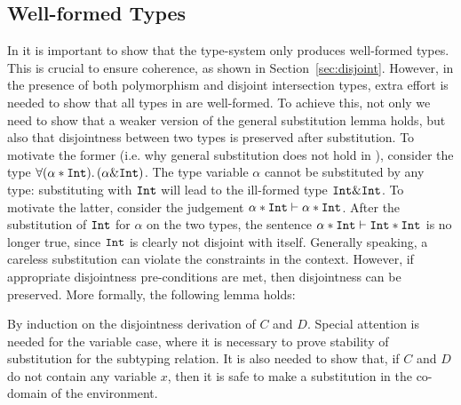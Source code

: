 \subsection{Well-formed Types}
In \name it is important to show that the type-system only produces well-formed types.
This is crucial to ensure coherence, as shown in Section~\ref{sec:disjoint}.
However, in the presence of both polymorphism and disjoint intersection types, extra
effort is needed to show that all types in \name are well-formed.
To achieve this, not only we need to show that a weaker version of the general substitution lemma holds, 
but also that disjointness between two types is preserved after substitution.
To motivate the former (i.e. why general substitution does not hold in \name), 
consider the type $\forall (\alpha * \texttt{Int}).\, (\alpha \& \texttt{Int})$. 
The type variable $\alpha$ cannot be substituted by any type: substituting with $\texttt{Int}$ will lead to the
ill-formed type $\texttt{Int} \& \texttt{Int}$.
To motivate the latter, consider the judgement $ \alpha * \texttt{Int} \vdash \alpha * \texttt{Int}$.
After the substitution of $\texttt{Int}$ for $\alpha$ on the two types, the sentence
$\alpha * \texttt{Int} \vdash \texttt{Int} * \texttt{Int}$ is no longer true, since $\texttt{Int}$ is
clearly not disjoint with itself.
Generally speaking, a careless substitution can violate the constraints in the context.
However, if appropriate disjointness pre-conditions are met, then disjointness can
be preserved.
More formally, the following lemma holds: 

{By induction on the disjointness derivation of $C$ and $D$.
  Special attention is needed for the variable case, where it is necessary to prove stability
  of substitution for the subtyping relation.
  It is also needed to show that, if $C$ and $D$ do not contain any variable $x$, then it is
  safe to make a substitution in the co-domain of the environment.}

